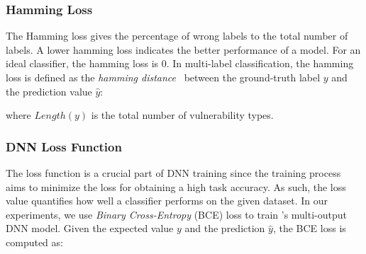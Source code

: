 
\vspace{0.1em}
\subsubsection{Hamming Loss}
The Hamming loss gives the percentage of wrong labels to the total number of labels. A lower hamming loss indicates the better performance of a model. For an ideal classifier, the hamming loss is 0. In multi-label classification, the hamming loss is defined as the \textit{hamming distance}~\cite{norouzi2012hamming} between the ground-truth label $y$ and the prediction value $\hat{y}$: \\ 

\noindent where $Length(y)$ is the total number of vulnerability types.

\vspace{0.1em}
\subsubsection{DNN Loss Function}
The loss function is a crucial part of DNN training since the training process aims to minimize the loss for obtaining a high task accuracy. 
As such, the loss value quantifies how well a classifier performs on the given dataset. In our experiments, we use \textit{Binary Cross-Entropy} (BCE) loss to train \sys{}'s multi-output DNN model. Given the expected value $y$ and the prediction $\hat{y}$, the BCE loss is computed as:  \\

